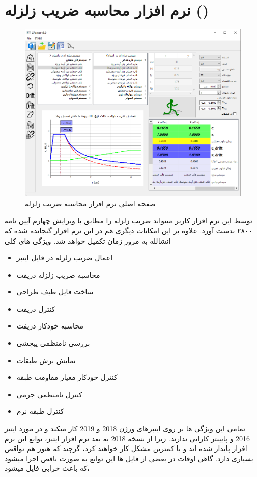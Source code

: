 \section{نرم افزار محاسبه ضریب زلزله ()}

\begin{figure}[H]
    \centering
    \includegraphics[scale=.6]{figures/cfactor}
    \caption{صفحه اصلی نرم افزار محاسبه ضریب زلزله}
\end{figure}
توسط این نرم افزار کاربر میتواند ضریب زلزله را مطابق با ویرایش چهارم آیین نامه ۲۸۰۰ بدست آورد. علاوه بر این امکانات دیگری هم در این نرم افزار گنجانده شده که انشالله به مرور زمان تکمیل خواهد شد. ویژگی های کلی

\begin{itemize}
    \item اعمال ضریب زلزله در فایل ایتبز
    \item محاسبه ضریب زلزله دریفت
    \item ساخت فایل طیف طراحی
    \item کنترل دریفت
    \item محاسبه خودکار دریفت
    \item بررسی نامنظمی پیچشی
    \item نمایش برش طبقات
    \item کنترل خودکار معیار مقاومت طبقه
    \item کنترل نامنظمی جرمی
    \item کنترل طبقه نرم
\end{itemize}

تمامی این ویژگی ها بر روی ایتبزهای ورژن 2018 و 2019 کار میکند و در مورد ایتبز 2016 و پایینتر کارایی ندارند. زیرا از نسخه 2018 به بعد نرم افزار ایتبز، 
توابع 
این نرم افزار پایدار شده اند و با کمترین مشکل کار خواهند کرد، گرچند که هنوز هم نواقص بسیاری دارد.
گاهی اوقات در بعضی از فایل ها این توابع به صورت ناقص اجرا میشود که باعث خرابی فایل میشود، 

